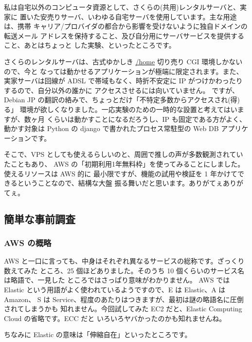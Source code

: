 \documentclass[mingoth,a4paper]{jsarticle}
\begin{document}
私は自宅以外のコンピュータ資源として、さくらの(共用)レンタルサーバと、実家に
置いた安売りサーバ、いわゆる自宅サーバを使用しています。主な用途は、携帯
キャリア/プロバイダの都合から影響を受けないように独自ドメインの転送メール
アドレスを保持すること、及び自分用にサーバサービスを提供すること、あとはちょっと
した実験、といったところです。

さくらのレンタルサーバは、古式ゆかしき \url{/home} 切り売り CGI 環境しかないので、今と
なっては動かせるアプリケーションが極端に限定されます。また、実家サーバは回線が
ADSL で帯域もなく、時折不安定に IP がつけかわったりするので、自分以外の誰かに
アクセスさせるには向いていません。
ですが、Debian JP の翻訳の絡みで、ちょっとだけ「不特定多数からアクセスされ(得)る」
環境が欲しくなりました。一応実験のための一時的な設置と考えてはいますが、数ヶ月
くらいは動かすことになるだろうし、IP も固定である方がよく、動かす対象は Python の
django で書かれたプロセス常駐型の Web DB アプリケーションです。

そこで、VPS としても使えるらしいのと、周囲で推しの声が多数観測されていたこともあり、
AWS の「初期利用1年無料枠」を使ってみることにしました。使えるリソースは AWS 的に
最小限ですが、機能の試用や検証を 1 年かけてできるということなので、結構な大盤
振る舞いだと思います。ありがてぇありがてぇ。

\subsection{簡単な事前調査}

\subsubsection{AWS の概略}
AWS と一口に言っても、中身はそれぞれ異なるサービスの総称です。ざっくり数えてみた
ところ、25 個ほどありました。そのうち 10 個くらいのサービス名は略語で、一見した
ところではさっぱり意味がわかりません。
AWS では Elastic という用語がよく使われているようですので、E は Elastic、A は Amazon、
S は Service、程度のあたりはつきますが、最初は謎の略語名に圧倒されてしまうかも
知れません。今回試してみた EC2 だと、Elastic Computing Cloud の省略です。ECC だと
いろいろヤバかったのかも知れませんね。

ちなみに Elastic の意味は「伸縮自在」といったところです。
\end{document}
